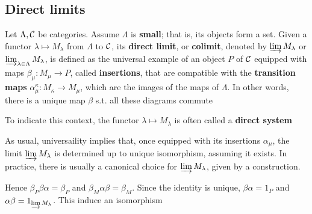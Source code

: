 \documentclass[11pt]{article}
\begin{document}
\subsection*{Direct limits \label{6.6}}
\label{sec:orgc05d7aa}
Let \(\Lambda,\mathcal{C}\) be categories. Assume \(\Lambda\) is \textbf{small}; that is, its objects form a
set. Given a functor \(\lambda\mapsto M_{\lambda}\) from \(\Lambda\) to \(\mathcal{C}\), its
\textbf{direct limit}, or \textbf{colimit}, denoted by \(\varinjlim M_\lambda\) or
\(\varinjlim_{\lambda\in\Lambda}M_\lambda\), is defined as the universal
example of an object \(P\) of \(\mathcal{C}\) equipped with maps
\(\beta_\mu:M_\mu\to P\), called \textbf{insertions}, that are compatible with the
\textbf{transition maps} \(\alpha^\kappa_\mu:M_\kappa\to M_\mu\), which are the images of
the maps of \(\Lambda\).  In other words, there is a unique map \(\beta\) s.t. all these
diagrams commute
\begin{center}
\end{center}
To indicate this context, the functor \(\lambda\mapsto M_\lambda\) is often
called a \textbf{direct system}

As usual, universaility implies that, once equipped with its insertions
\(\alpha_\mu\), the limit \(\varinjlim M_\lambda\) is determined up to unique
isomorphism, assuming it exists. In practice, there is usually a canonical
choice for \(\varinjlim M_\lambda\), given by a construction.
\begin{center}
\end{center}
Hence \(\beta_P\beta\alpha=\beta_P\) and \(\beta_M\alpha\beta=\beta_M\).
Since the identity is unique, \(\beta\alpha=1_P\) and
\(\alpha\beta=1_{\varinjlim M_\lambda}\). This induce an isomorphism
\end{document}
